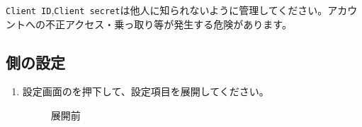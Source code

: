             \begin{itembox}[c]{}
                \texttt{Client ID},\texttt{Client secret}は他人に知られないように管理してください。アカウントへの不正アクセス・乗っ取り等が発生する危険があります。
            \end{itembox}

    \newpage
    \subsection{\bj 側の設定}
    \label{sec:spotify6}
        \begin{enumerate}
            \item 設定画面のを押下して、設定項目を展開してください。
                \begin{figure}[htbp]
                    \begin{minipage}[b]{0.45\linewidth}
                        \centering
                        \caption{展開前}
                        \label{img:spotify10}
                    \end{minipage}
                    \begin{minipage}[b]{0.45\linewidth}
                        \centering
                        \fbox{
}
\end{minipage}
\end{figure}
\end{enumerate}

